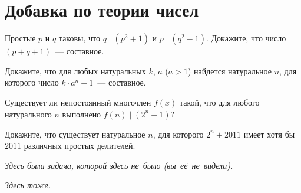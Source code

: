 

\section*{Добавка по теории чисел}


\begin{problems}

\item
Простые $p$ и $q$ таковы, что $q \mid (p^2 + 1)$ и $p \mid (q^2 - 1)$.
Докажите, что число $(p + q + 1)$~--- составное.

\item
Докажите, что для любых натуральных $k$, $a$ ($a > 1$) найдется натуральное $n$, для
которого число $k \cdot a^n + 1$~--- составное.

\item
Существует ли непостоянный многочлен $f(x)$ такой, что для любого натурального $n$
выполнено $f(n) \mid (2^n - 1)$?

\item
Докажите, что существует натуральное $n$, для которого $2^n + 2011$ имеет хотя бы
$2011$ различных простых делителей.

\item
\emph{Здесь была задача, которой здесь не~было (вы~её~не~видели).}

\item
\emph{Здесь тоже.}

\end{problems}

